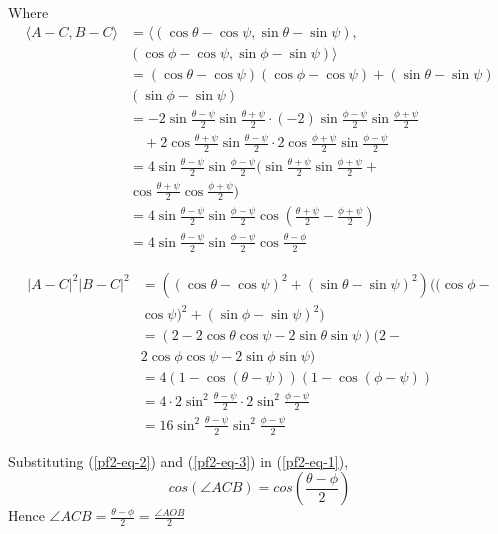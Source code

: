 \documentclass[journal,10pt,twocolumn]{article}
\begin{document}
Where
\begin{equation}
		\begin{aligned}
	\langle A-C, B-C\rangle &= \langle (\cos\theta-\cos\psi,\sin\theta-\sin\psi),\\
	&(\cos\phi-\cos\psi,\sin\phi-\sin\psi)\rangle\\
	&= (\cos\theta-\cos\psi)(\cos\phi-\cos\psi)+(\sin\theta-\sin\psi)\\
	&(\sin\phi-\sin\psi)\\
	&= -2\sin\frac{\theta-\psi}2\sin\frac{\theta+\psi}2 \cdot(-2)\sin\frac{\phi-\psi}2\sin\frac{\phi+\psi}2 \\&\quad+ 2\cos\frac{\theta+\psi}2\sin\frac{\theta-\psi}2 \cdot 2\cos\frac{\phi+\psi}2\sin\frac{\phi-\psi}2\\
	&= 4\sin\frac{\theta-\psi}2\sin\frac{\phi-\psi}2(\sin\frac{\theta+\psi}2\sin\frac{\phi+\psi}2+\\
	&\cos\frac{\theta+\psi}2\cos\frac{\phi+\psi}2)\\
	&= 4\sin\frac{\theta-\psi}2\sin\frac{\phi-\psi}2\cos\left(\frac{\theta+\psi}2-\frac{\phi+\psi}2\right)\\
	&= 4\sin\frac{\theta-\psi}2\sin\frac{\phi-\psi}2\cos\frac{\theta-\phi}2
	\end{aligned}
	\label{pf2-eq-2}
\end{equation}

\begin{equation}
	\begin{aligned}
	|A-C|^2|B-C|^2 &= ((\cos\theta-\cos\psi)^2+(\sin\theta-\sin\psi)^2)((\cos\phi-\\ 
	&\cos\psi)^2+(\sin\phi-\sin\psi)^2)\\
	&= (2-2\cos\theta\cos\psi - 2\sin\theta\sin\psi)(2-\\
	&2\cos\phi\cos\psi - 2\sin\phi\sin\psi)\\
	&= 4(1-\cos(\theta-\psi))(1-\cos(\phi-\psi))\\
	&= 4\cdot 2\sin^2\frac{\theta-\psi}2\cdot 2\sin^2\frac{\phi-\psi}2\\
	&= 16 \sin^2\frac{\theta-\psi}2\sin^2\frac{\phi-\psi}2
	\end{aligned}
	\label{pf2-eq-3}
\end{equation}

Substituting (\ref{pf2-eq-2}) and (\ref{pf2-eq-3}) in (\ref{pf2-eq-1}),
\begin{equation}
	cos(\angle ACB) = cos(\frac{\theta-\phi}{2})	
\end{equation}
Hence $\angle ACB = \frac{\theta-\phi}{2} = \frac{\angle AOB}{2}$
\end{document}
